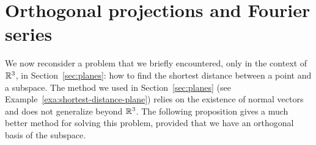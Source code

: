 \section{Orthogonal projections and Fourier series}


We now reconsider a problem that we briefly encountered, only in the
context of $\mathbb{R}^3$, in Section~\ref{sec:planes}: how to find the
shortest distance between a point and a subspace. The method we used
in Section~\ref{sec:planes} (see
Example~\ref{exa:shortest-distance-plane}) relies on the existence of
normal vectors and does not generalize beyond $\mathbb{R}^3$. The following
proposition gives a much better method for solving this problem,
provided that we have an orthogonal basis of the subspace.

